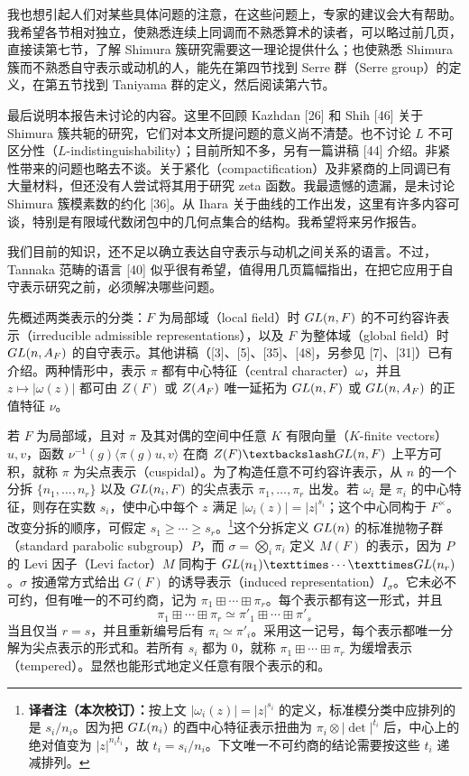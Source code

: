 我也想引起人们对某些具体问题的注意，在这些问题上，专家的建议会大有帮助。我希望各节相对独立，使熟悉连续上同调而不熟悉算术的读者，可以略过前几页，直接读第七节，了解 Shimura 簇研究需要这一理论提供什么；也使熟悉 Shimura 簇而不熟悉自守表示或动机的人，能先在第四节找到 Serre 群（Serre group）的定义，在第五节找到 Taniyama 群的定义，然后阅读第六节。

最后说明本报告未讨论的内容。这里不回顾 Kazhdan [26] 和 Shih [46] 关于 Shimura 簇共轭的研究，它们对本文所提问题的意义尚不清楚。也不讨论 $L$ 不可区分性（$L$-indistinguishability）；目前所知不多，另有一篇讲稿 [44] 介绍。非紧性带来的问题也略去不谈。关于紧化（compactification）及非紧商的上同调已有大量材料，但还没有人尝试将其用于研究 zeta 函数。我最遗憾的遗漏，是未讨论 Shimura 簇模素数的约化 [36]。从 Ihara 关于曲线的工作出发，这里有许多内容可谈，特别是有限域代数闭包中的几何点集合的结构。我希望将来另作报告。

我们目前的知识，还不足以确立表达自守表示与动机之间关系的语言。不过，Tannaka 范畴的语言 [40] 似乎很有希望，值得用几页篇幅指出，在把它应用于自守表示研究之前，必须解决哪些问题。

先概述两类表示的分类：$F$ 为局部域（local field）时 $GL(n,F)$ 的不可约容许表示（irreducible admissible representations），以及 $F$ 为整体域（global field）时 $GL(n,A_F)$ 的自守表示。其他讲稿（[3]、[5]、[35]、[48]，另参见 [7]、[31]）已有介绍。两种情形中，表示 $\pi$ 都有中心特征（central character）$\omega$，并且
$z\mapsto|\omega(z)|$ 都可由 $Z(F)$ 或 $Z(A_F)$ 唯一延拓为
$GL(n,F)$ 或 $GL(n,A_F)$ 的正值特征 $\nu$。

若 $F$ 为局部域，且对 $\pi$ 及其对偶的空间中任意 $K$ 有限向量（$K$-finite vectors）$u,v$，函数
$\nu^{-1}(g)\langle\pi(g)u,v\rangle$ 在商
$Z(F)\backslash\GL(n,F)$ 上平方可积，就称 $\pi$ 为尖点表示（cuspidal）。为了构造任意不可约容许表示，从 $n$ 的一个分拆
$\{n_1,\ldots,n_r\}$ 以及 $GL(n_i,F)$ 的尖点表示 $\pi_1,\ldots,\pi_r$ 出发。若
$\omega_i$ 是 $\pi_i$ 的中心特征，则存在实数 $s_i$，使中心中每个 $z$ 满足
$|\omega_i(z)|=|z|^{s_i}$；这个中心同构于 $F^\times$。改变分拆的顺序，可假定
$s_1\ge\cdots\ge s_r$。\footnote{\textbf{译者注（本次校订）：}按上文 $|\omega_i(z)|=|z|^{s_i}$ 的定义，标准模分类中应排列的是 $s_i/n_i$。因为把 $GL(n_i)$ 的酉中心特征表示扭曲为 $\pi_i\otimes|\det|^{t_i}$ 后，中心上的绝对值变为 $|z|^{n_it_i}$，故 $t_i=s_i/n_i$。下文唯一不可约商的结论需要按这些 $t_i$ 递减排列。}这个分拆定义 $GL(n)$ 的标准抛物子群（standard parabolic subgroup）$P$，而 $\sigma=\bigotimes_i\pi_i$ 定义 $M(F)$ 的表示，因为 $P$ 的 Levi 因子（Levi factor）$M$ 同构于
$\GL(n_1)\times\cdots\times\GL(n_r)$。$\sigma$ 按通常方式给出 $G(F)$ 的诱导表示（induced representation）$I_\sigma$。它未必不可约，但有唯一的不可约商，记为
$\pi_1\boxplus\cdots\boxplus\pi_r$。每个表示都有这一形式，并且
\[
\pi_1\boxplus\cdots\boxplus\pi_r\simeq\pi'_1\boxplus\cdots\boxplus\pi'_s
\]
当且仅当 $r=s$，并且重新编号后有 $\pi_i\simeq\pi'_i$。采用这一记号，每个表示都唯一分解为尖点表示的形式和。若所有 $s_i$ 都为 $0$，就称
$\pi_1\boxplus\cdots\boxplus\pi_r$ 为缓增表示（tempered）。显然也能形式地定义任意有限个表示的和。

